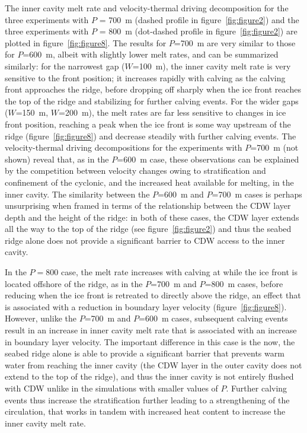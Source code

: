 \documentclass[draft]{agujournal2019}
\begin{document}
The inner cavity melt rate and velocity-thermal driving decomposition for the three experiments with $P$ = 700~m (dashed profile in figure~\ref{fig:figure2}) and the three experiments with $P$ = 800~m (dot-dashed profile in figure~\ref{fig:figure2}) are plotted in figure~\ref{fig:figure8}. The results for $P$=700~m are very similar to those for $P$=600~m, albeit with slightly lower melt rates, and can be summarized similarly: for the narrowest gap ($W$=100~m), the inner cavity melt rate is very sensitive to the front position; it increases rapidly with calving as the calving front approaches the ridge, before dropping off sharply when the ice front reaches the top of the ridge and stabilizing for further calving events. For the wider gaps ($W$=150~m, $W$=200~m), the melt rates are far less sensitive to changes in ice front position, reaching a peak when the ice front is some way upstream of the ridge (figure~\ref{fig:figure8}) and decrease steadily with further calving events. The velocity-thermal driving decompositions for the experiments with $P$=700~m (not shown) reveal that, as in the $P$=600~m case, these observations can be explained by the competition between velocity changes owing to stratification and confinement of the cyclonic, and the increased heat available for melting, in the inner cavity. The similarity between the $P$=600~m and $P$=700~m cases is perhaps unsurprising when framed in terms of the relationship between the CDW layer depth and the height of the ridge: in both of these cases, the CDW layer extends all the way to the top of the ridge (see figure~\ref{fig:figure2}) and thus the seabed ridge alone does not provide a significant barrier to CDW access to the inner cavity.

In the $P = 800$ case, the melt rate increases with calving at while the ice front is located offshore of the ridge, as in the $P$=700~m and $P$=800~m cases, before reducing when the ice front is retreated to directly above the ridge, an effect that is associated with a reduction in boundary layer velocity (figure~\ref{fig:figure8}). However, unlike the $P$=700~m and $P$=600~m cases, subsequent calving events result in an increase in inner cavity melt rate that is associated with an increase in boundary layer velocity. The important difference in this case is the now, the seabed ridge alone is able to provide a significant barrier that prevents warm water from reaching the inner cavity (the CDW layer in the outer cavity does not extend to the top of the ridge), and thus the inner cavity is not entirely flushed with CDW unlike in the simulations with smaller values of $P$. Further calving events thus increase the stratification further leading to a strengthening of the circulation, that works in tandem with increased heat content to increase the inner cavity melt rate.
\end{document}
